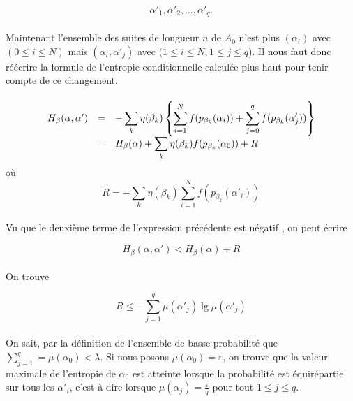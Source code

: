 	\[\alpha'_1, \alpha'_2, \dots, \alpha'_q.\]
	
	\paragraph{}
	Maintenant l'ensemble des suites de longueur $n$ de $A_0$ n'est plus 
	$(\alpha_i)$ avec $(0 \le i \le N)$ mais $(\alpha_i, \alpha'_j)$ avec 
	$(1\le i \le N, 1 \le j \le q$). Il nous faut donc réécrire la formule de
	 l'entropie conditionnelle calculée plus haut pour tenir compte de ce
	 changement.
	
	\paragraph{}
	\[
		\begin{array}{r c >{\displaystyle}l}
			H_\beta(\alpha,\alpha') &=& 
				- \sum_k\eta(\beta_k)\left\{
					\sum_{i=1}^Nf(p_{\beta_k}(\alpha_i))+
					\sum_{j=0}^qf(p_{\beta_k}(\alpha'_j))
				\right\}\\
			&=& H_\beta(\alpha) + 
				\sum_k\eta(\beta_k)f(p_{\beta_k}(\alpha_0))+R
		\end{array}
	\]
	où
	\[R=- \sum_k\eta(\beta_k)\sum_{i=1}^Nf(p_{\beta_k}(\alpha'_i))\]
	
	\paragraph{}
	Vu que le deuxième terme de l'expression précédente est négatif 
	, on peut écrire
	
	\[H_\beta(\alpha,\alpha') < H_\beta(\alpha) + R\]
	
	\paragraph{}
	On trouve
	
	\[R \le -\sum_{j=1}^q\mu(\alpha'_j)\lg\mu(\alpha'_j)\]
	
	\paragraph{}
	On sait, par la définition de l'ensemble de basse probabilité que 
	$\sum_{j=1}^q =\mu(\alpha_0) < \lambda$. Si nous posons 
	$\mu(\alpha_0)=\varepsilon$, on trouve que la valeur maximale 
	de l'entropie de $\alpha_0$ est atteinte lorsque la probabilité 
	est équirépartie sur tous les $\alpha'_i$, c'est-à-dire lorsque
	 $\mu(\alpha_j)=\frac{\varepsilon}{q}$ pour tout $1\le j\le q$.
	
